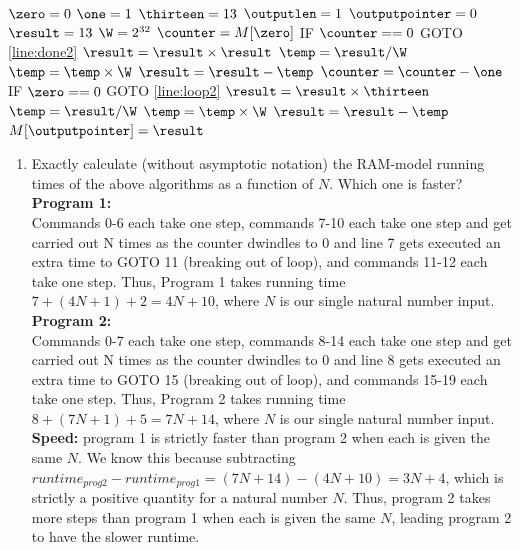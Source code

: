 \documentclass[11pt]{article}
\begin{document}
\begin{enumerate}
\begin{algorithm}[H]
\setcounter{AlgoLine}{-1}
$\zero = 0$\;
$\one = 1$\;
$\thirteen = 13$\;
$\outputlen = 1$\;
$\outputpointer = 0$\;
$\result = 13$\;
$\W = 2^{32}$\;
$\counter = M[\zero]$\;
\Indp
IF $\counter == 0$ GOTO \ref{line:done2}\; \label{line:loop2}
$\result = \result \times \result$\;
$\temp = \result / \W$\;
$\temp = \temp \times \W$\;
$\result = \result - \temp$\;
$\counter = \counter - \one$\;
IF $\zero == 0$ GOTO \ref{line:loop2}\;
\Indm
$\result = \result \times \thirteen$\;
\label{line:done2}
$\temp = \result / \W$\;
$\temp = \temp \times \W$\;
$\result = \result - \temp$\;
$M[\outputpointer]=\result$\; 
\end{algorithm}

\begin{enumerate}
    \item Exactly calculate (without asymptotic notation) the RAM-model running times of the above algorithms as a function of $N$.
    Which one is faster? \label{itm:RAMtime}  \\

  \textbf{  Program 1:} \\

    Commands 0-6 each take one step, commands 7-10 each take one step and get carried out N times as the counter dwindles to 0 and line 7 gets executed an extra time to GOTO 11 (breaking out of loop), and commands 11-12 each take one step. Thus, Program 1 takes running time $7 + (4N + 1) + 2 = 4N + 10$, where $N$ is our single natural number input. \\

    \textbf{Program 2:} \\

    Commands 0-7 each take one step, commands 8-14 each take one step and get carried out N times as the counter dwindles to 0 and line 8 gets executed an extra time to GOTO 15 (breaking out of loop), and commands 15-19 each take one step. Thus, Program 2 takes running time $8 + (7N + 1) + 5 = 7N + 14$, where $N$ is our single natural number input. \\

    \textbf{Speed:} program 1 is strictly faster than program 2 when each is given the same $N$. We know this because subtracting $runtime_{prog2} - runtime_{prog1} = (7N + 14) - (4N + 10) = 3N + 4$, which is strictly a positive quantity for a natural number $N$. Thus, program 2 takes more steps than program 1 when each is given the same $N$, leading program 2 to have the slower runtime. \\
    

\end{enumerate}
\end{enumerate}
\end{document}
